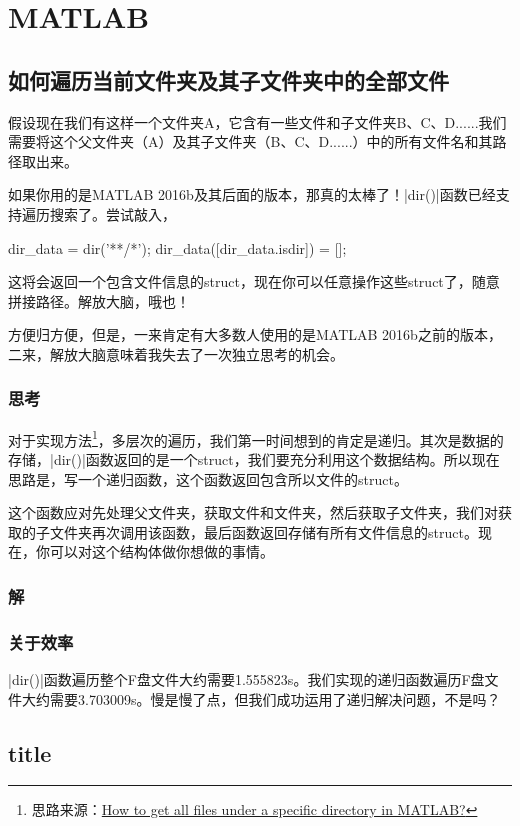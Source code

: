 \chapter{MATLAB}

\section{如何遍历当前文件夹及其子文件夹中的全部文件}

假设现在我们有这样一个文件夹A，它含有一些文件和子文件夹B、C、D......我们需要将这个父文件夹（A）及其子文件夹（B、C、D......）中的所有文件名和其路径取出来。

如果你用的是MATLAB 2016b及其后面的版本，那真的太棒了！\Matlabinline|dir()|函数已经支持遍历搜索了。尝试敲入，

\begin{Matlabcode}
dir_data = dir('**/*');
dir_data([dir_data.isdir]) = [];  %
\end{Matlabcode}

这将会返回一个包含文件信息的struct，现在你可以任意操作这些struct了，随意拼接路径。解放大脑，哦也！

方便归方便，但是，一来肯定有大多数人使用的是MATLAB 2016b之前的版本，二来，解放大脑意味着我失去了一次独立思考的机会。

\subsection*{思考}

对于实现方法\footnote{思路来源：\href{https://stackoverflow.com/questions/2652630/how-to-get-all-files-under-a-specific-directory-in-matlab}{How to get all files under a specific directory in MATLAB?}}，多层次的遍历，我们第一时间想到的肯定是递归。其次是数据的存储，\Matlabinline|dir()|函数返回的是一个struct，我们要充分利用这个数据结构。所以现在思路是，写一个递归函数，这个函数返回包含所以文件的struct。

这个函数应对先处理父文件夹，获取文件和文件夹，然后获取子文件夹，我们对获取的子文件夹再次调用该函数，最后函数返回存储有所有文件信息的struct。现在，你可以对这个结构体做你想做的事情。

\subsection*{解}


\subsection*{关于效率}
\Matlabinline|dir()|函数遍历整个F盘文件大约需要1.555823s。我们实现的递归函数遍历F盘文件大约需要3.703009s。慢是慢了点，但我们成功运用了递归解决问题，不是吗？

\section{title}